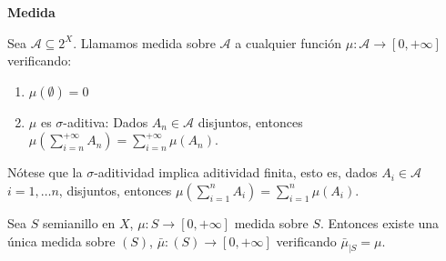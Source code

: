 \begin{definition} \textbf{Medida}

 Sea $\mathcal{A} \subseteq 2^X$. Llamamos medida sobre $\mathcal{A}$ a cualquier función 
 $\mu: \mathcal{A} \rightarrow [0, +\infty]$ verificando:

 \begin{enumerate}[i]
  \item $\mu(\emptyset) = 0$
  \item $\mu$ es $\sigma$-aditiva: Dados $A_n \in \mathcal{A}$ disjuntos, entonces 
   $\mu\left(\sum_{i=n}^{+\infty} A_n \right)= \sum_{i=n}^{+\infty} \mu(A_n)$.
 \end{enumerate}
\end{definition}

Nótese que la $\sigma$-aditividad implica aditividad finita, esto es, dados $A_i \in \mathcal{A}$ $i=1, \ldots n$,
disjuntos, entonces $\mu\left(\sum_{i=1}^{n} A_i \right)= \sum_{i=1}^{n} \mu(A_i)$.

\begin{theorem}
 Sea $S$ semianillo en $X$, $\mu: S \rightarrow [0,+\infty]$ medida sobre $S$. Entonces existe una única medida 
 sobre $(S)$, $\bar{\mu}: (S) \rightarrow [0,+\infty]$ verificando $\bar{\mu}_{|S} = \mu$.
 
 \label{th:ext-semitoring}
\end{theorem}

